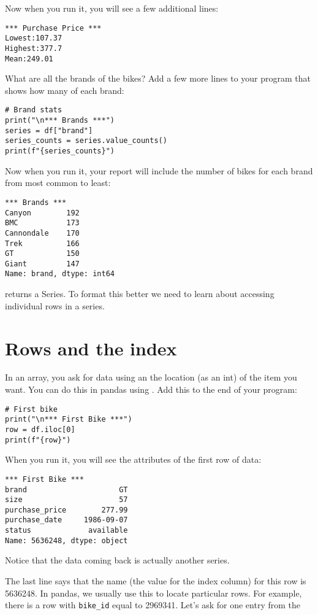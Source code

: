 Now when you run it, you will see a few additional lines:
\begin{Verbatim}
*** Purchase Price ***
Lowest:107.37
Highest:377.7
Mean:249.01
\end{Verbatim}

What are all the brands of the bikes? Add a few more lines to your
program that shows how many of each brand:

\begin{Verbatim}
# Brand stats
print("\n*** Brands ***")
series = df["brand"]
series_counts = series.value_counts()
print(f"{series_counts}")
\end{Verbatim}

Now when you run it, your report will include the number of bikes for
each brand from most common to least:

\begin{Verbatim}
*** Brands ***
Canyon        192
BMC           173
Cannondale    170
Trek          166
GT            150
Giant         147
Name: brand, dtype: int64
\end{Verbatim}

 returns a Series.  To format this better we
need to learn about accessing individual rows in a series.

\section{Rows and the index}

In an array, you ask for data using an the location (as an int) of the
item you want. You can do this in pandas using . Add
this to the end of your program:

\begin{Verbatim}
# First bike
print("\n*** First Bike ***")
row = df.iloc[0]
print(f"{row}")
\end{Verbatim}

When you run it, you will see the attributes of the first row of data:

\begin{Verbatim}
*** First Bike ***
brand                     GT
size                      57
purchase_price        277.99
purchase_date     1986-09-07
status             available
Name: 5636248, dtype: object
\end{Verbatim}

Notice that the data coming back is actually another series.

The last line says that the name (the value for the index column) for
this row is 5636248.  In pandas, we usually use this to locate
particular rows.  For example, there is a row with \texttt{bike\_id}
equal to 2969341. Let's ask for one entry from the 

